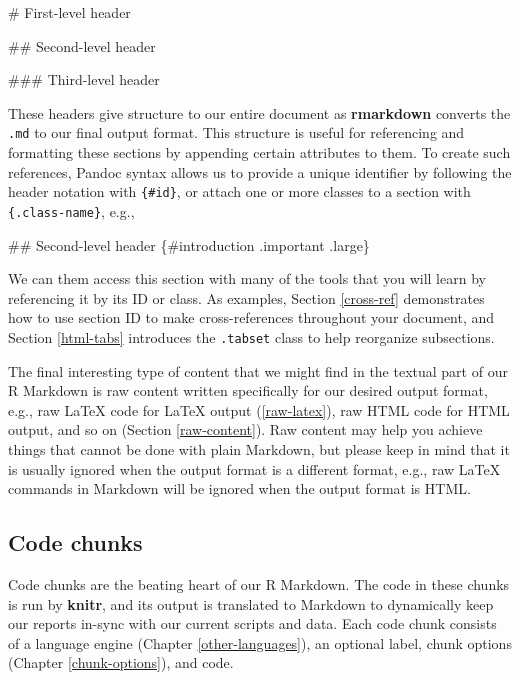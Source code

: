 \documentclass[
  11pt,
]{krantz}
\newenvironment{Shaded}{\begin{snugshade}}{\end{snugshade}}
\newcommand{\FunctionTok}[1]{\textcolor[rgb]{0,0,0}{#1}}
\begin{document}
\begin{Shaded}
\begin{Highlighting}[]
\FunctionTok{# First-level header}

\FunctionTok{## Second-level header}

\FunctionTok{### Third-level header}
\end{Highlighting}
\end{Shaded}

These headers give structure to our entire document as \textbf{rmarkdown} converts the \texttt{.md} to our final output format. This structure is useful for referencing and formatting these sections by appending certain attributes to them. To create such references, Pandoc syntax allows us to provide a unique identifier by following the header notation with \texttt{\{\#id\}}, or attach one or more classes to a section with \texttt{\{.class-name\}}, e.g.,

\begin{Shaded}
\begin{Highlighting}[]
\FunctionTok{## Second-level header \{#introduction .important .large\}}
\end{Highlighting}
\end{Shaded}

We can them access this section with many of the tools that you will learn by referencing it by its ID or class. As examples, Section \ref{cross-ref} demonstrates how to use section ID to make cross-references throughout your document, and Section \ref{html-tabs} introduces the \texttt{.tabset} class to help reorganize subsections.

The final interesting type of content that we might find in the textual part of our R Markdown is raw content written specifically for our desired output format, e.g., raw LaTeX code for LaTeX output (\ref{raw-latex}), raw HTML code for HTML output, and so on (Section \ref{raw-content}). Raw content may help you achieve things that cannot be done with plain Markdown, but please keep in mind that it is usually ignored when the output format is a different format, e.g., raw LaTeX commands in Markdown will be ignored when the output format is HTML.

\hypertarget{code-chunks}{%
\subsection{Code chunks}\label{code-chunks}}

Code chunks are the beating heart of our R Markdown. The code in these chunks is run by \textbf{knitr}, and its output is translated to Markdown to dynamically keep our reports in-sync with our current scripts and data. Each code chunk consists of a language engine (Chapter \ref{other-languages}), an optional label, chunk options (Chapter \ref{chunk-options}), and code.
\end{document}
